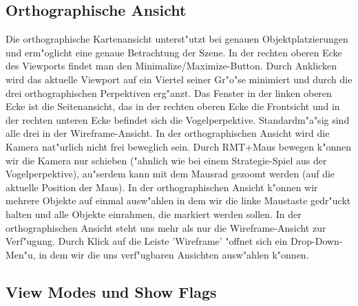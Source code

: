 \documentclass[11pt, titlepage]{article}
\begin{document}
\newpage

\subsection{Orthographische Ansicht}

\noindent Die orthographische Kartenansicht unterst"utzt bei genauen Objektplatzierungen und erm"oglicht eine genaue Betrachtung der Szene. In der rechten oberen Ecke des Viewports findet man den Minimalize/Maximize-Button. Durch Anklicken wird das aktuelle Viewport auf ein Viertel seiner Gr"o"se minimiert und durch die drei orthographischen Perpektiven erg"anzt. \newline
\noindent Das Fenster in der linken oberen Ecke ist die Seitenansicht, das in der rechten oberen Ecke die Frontsicht und in der rechten unteren Ecke befindet sich die Vogelperpektive. \newline
\noindent Standardm"a"sig sind alle drei in der Wireframe-Ansicht. \newline
\noindent In der orthographischen Ansicht wird die Kamera nat"urlich nicht frei beweglich sein. Durch RMT+Maus bewegen k"onnen wir die Kamera nur schieben ("ahnlich wie bei einem Strategie-Spiel aus der Vogelperpektive), au"serdem kann mit dem Mausrad gezoomt werden (auf die aktuelle Position der Maus). In der orthographischen Ansicht k"onnen wir mehrere Objekte auf einmal ausw"ahlen in dem wir die linke Maustaste gedr"uckt halten und alle Objekte einrahmen, die markiert werden sollen. \newline
\newline
\noindent In der orthographischen Ansicht steht uns mehr als nur die Wireframe-Ansicht zur Verf"ugung. Durch Klick auf die Leiste 'Wireframe' "offnet sich ein Drop-Down-Men"u, in dem wir die uns verf"ugbaren Ansichten ausw"ahlen k"onnen.

\subsection{View Modes und Show Flags}
\end{document}
